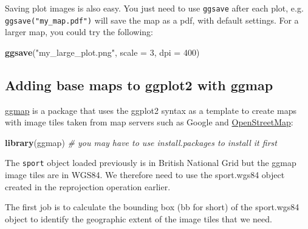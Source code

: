 \documentclass[]{article}
\newenvironment{Shaded}{}{}
\newcommand{\KeywordTok}[1]{\textcolor[rgb]{0.00,0.44,0.13}{\textbf{{#1}}}}
\newcommand{\DataTypeTok}[1]{\textcolor[rgb]{0.56,0.13,0.00}{{#1}}}
\newcommand{\DecValTok}[1]{\textcolor[rgb]{0.25,0.63,0.44}{{#1}}}
\newcommand{\FloatTok}[1]{\textcolor[rgb]{0.25,0.63,0.44}{{#1}}}
\newcommand{\StringTok}[1]{\textcolor[rgb]{0.25,0.44,0.63}{{#1}}}
\newcommand{\CommentTok}[1]{\textcolor[rgb]{0.38,0.63,0.69}{\textit{{#1}}}}
\newcommand{\NormalTok}[1]{{#1}}
\begin{document}
Saving plot images is also easy. You just need to use \texttt{ggsave}
after each plot, e.g. \texttt{ggsave("my\_map.pdf")} will save the map
as a pdf, with default settings. For a larger map, you could try the
following:

\begin{Shaded}
\begin{Highlighting}[]
\KeywordTok{ggsave}\NormalTok{(}\StringTok{"my_large_plot.png"}\NormalTok{, }\DataTypeTok{scale =} \DecValTok{3}\NormalTok{, }\DataTypeTok{dpi =} \DecValTok{400}\NormalTok{)}
\end{Highlighting}
\end{Shaded}

\subsection{Adding base maps to ggplot2 with
ggmap}\label{adding-base-maps-to-ggplot2-with-ggmap}

\href{http://journal.r-project.org/archive/2013-1/kahle-wickham.pdf}{ggmap}
is a package that uses the ggplot2 syntax as a template to create maps
with image tiles taken from map servers such as Google and
\href{http://www.openstreetmap.org/}{OpenStreetMap}:

\begin{Shaded}
\begin{Highlighting}[]
\KeywordTok{library}\NormalTok{(ggmap)  }\CommentTok{# you may have to use install.packages to install it first}
\end{Highlighting}
\end{Shaded}

The \texttt{sport} object loaded previously is in British National Grid
but the ggmap image tiles are in WGS84. We therefore need to use the
sport.wgs84 object created in the reprojection operation earlier.

The first job is to calculate the bounding box (bb for short) of the
sport.wgs84 object to identify the geographic extent of the image tiles
that we need.

\begin{Shaded}
\end{Shaded}
\end{document}
